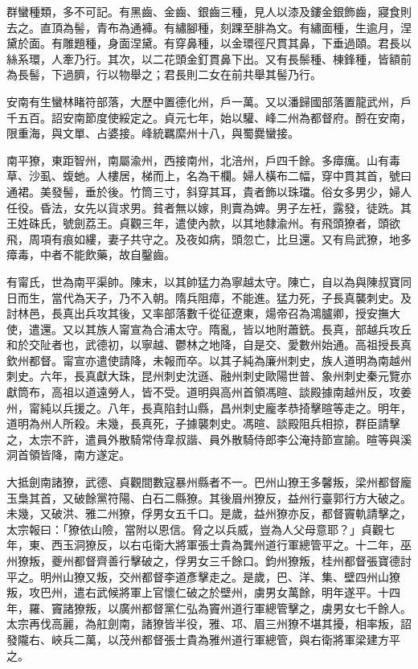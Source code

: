 \begin{pinyinscope}
 群蠻種類，多不可記。有黑齒、金齒、銀齒三種，見人以漆及鏤金銀飾齒，寢食則去之。直頂為髻，青布為通褲。有繡腳種，刻踝至腓為文。有繡面種，生逾月，涅黛於面。有雕題種，身面涅黛。有穿鼻種，以金環徑尺貫其鼻，下垂過頤。君長以絲系環，人牽乃行。其次，以二花頭金釘貫鼻下出。又有長鬃種、棟鋒種，皆額前為長髻，下過臍，行以物舉之；君長則二女在前共舉其髻乃行。



 安南有生蠻林睹符部落，大歷中置德化州，戶一萬。又以潘歸國部落置龍武州，戶千五百。詔安南節度使綏定之。貞元七年，始以驩、峰二州為都督府。酹在安南，限重海，與文單、占婆接。峰統羈縻州十八，與蜀爨蠻接。



 南平獠，東距智州，南屬渝州，西接南州，北涪州，戶四千餘。多瘴癘。山有毒草、沙虱、蝮虵。人樓居，梯而上，名為干欄。婦人橫布二幅，穿中貫其首，號曰通裙。美發髻，垂於後。竹筒三寸，斜穿其耳，貴者飾以珠璫。俗女多男少，婦人任役。昏法，女先以貨求男。貧者無以嫁，則賣為婢。男子左衽，露發，徒跣。其王姓硃氏，號劍荔王。貞觀三年，遣使內款，以其地隸渝州。有飛頭獠者，頭欲飛，周項有痕如縷，妻子共守之。及夜如病，頭忽亡，比旦還。又有烏武獠，地多瘴毒，中者不能飲藥，故自鑿齒。



 有甯氏，世為南平渠帥。陳末，以其帥猛力為寧越太守。陳亡，自以為與陳叔寶同日而生，當代為天子，乃不入朝。隋兵阻瘴，不能進。猛力死，子長真襲刺史。及討林邑，長真出兵攻其後，又率部落數千從征遼東，煬帝召為鴻臚卿，授安撫大使，遣還。又以其族人甯宣為合浦太守。隋亂，皆以地附蕭銑。長真，部越兵攻丘和於交阯者也，武德初，以寧越、鬱林之地降，自是交、愛數州始通。高祖授長真欽州都督。甯宣亦遣使請降，未報而卒。以其子純為廉州刺史，族人道明為南越州刺史。六年，長真獻大珠，昆州刺史沈遜、融州刺史歐陽世普、象州刺史秦元覽亦獻筒布，高祖以道遠勞人，皆不受。道明與高州首領馮暄、談殿據南越州反，攻姜州，甯純以兵援之。八年，長真陷封山縣，昌州刺史龐孝恭掎擊暄等走之。明年，道明為州人所殺。未幾，長真死，子據襲刺史。馮暄、談殿阻兵相掠，群臣請擊之，太宗不許，遣員外散騎常侍韋叔諧、員外散騎侍郎李公淹持節宣諭。暄等與溪洞首領皆降，南方遂定。



 大抵劍南諸獠，武德、貞觀間數寇暴州縣者不一。巴州山獠王多馨叛，梁州都督龐玉梟其首，又破餘黨符陽、白石二縣獠。其後眉州獠反，益州行臺郭行方大破之。未幾，又破洪、雅二州獠，俘男女五千口。是歲，益州獠亦反，都督竇軌請擊之，太宗報曰：「獠依山險，當附以恩信。脅之以兵威，豈為人父母意耶？」貞觀七年，東、西玉洞獠反，以右屯衛大將軍張士貴為龔州道行軍總管平之。十二年，巫州獠叛，夔州都督齊善行擊破之，俘男女三千餘口。鈞州獠叛，桂州都督張寶德討平之。明州山獠又叛，交州都督李道彥擊走之。是歲，巴、洋、集、壁四州山獠叛，攻巴州，遣右武候將軍上官懷仁破之於壁州，虜男女萬餘，明年遂平。十四年，羅、竇諸獠叛，以廣州都督黨仁弘為竇州道行軍總管擊之，虜男女七千餘人。太宗再伐高麗，為舡劍南，諸獠皆半役，雅、邛、眉三州獠不堪其擾，相率叛，詔發隴右、峽兵二萬，以茂州都督張士貴為雅州道行軍總管，與右衛將軍梁建方平之。




\end{pinyinscope}
